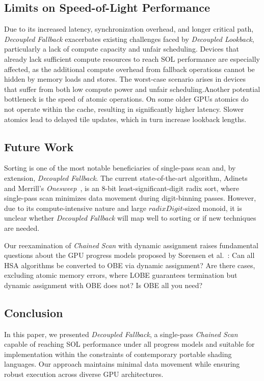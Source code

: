 \documentclass[acmsmall, manuscript, screen, review, anonymous]{acmart}
\begin{document}
\subsection{Limits on Speed-of-Light Performance}
Due to its increased latency, synchronization overhead, and longer critical path, \emph{Decoupled Fallback} exacerbates existing challenges faced by \emph{Decoupled Lookback}, particularly a lack of compute capacity and unfair scheduling. Devices that already lack sufficient compute resources to reach SOL performance are especially affected, as the additional compute overhead from fallback operations cannot be hidden by memory loads and stores. The worst-case scenario arises in devices that suffer from both low compute power and unfair scheduling.Another potential bottleneck is the speed of atomic operations. On some older GPUs atomics do not operate within the cache, resulting in significantly higher latency. Slower atomics lead to delayed tile updates, which in turn increase lookback lengths.

\subsection{Future Work}
Sorting is one of the most notable beneficiaries of single-pass scan and, by extension, \emph{Decoupled Fallback}. The current state-of-the-art algorithm, Adinets and Merrill's \emph{Onesweep}~\cite{adinets2022onesweepfastersignificantdigit}, is an 8-bit least-significant-digit radix sort, where single-pass scan minimizes data movement during digit-binning passes. However, due to its compute-intensive nature and large $radixDigit$-sized monoid, it is unclear whether \emph{Decoupled Fallback} will map well to sorting or if new techniques are needed.

Our reexamination of \emph{Chained Scan} with dynamic assignment raises fundamental questions about the GPU progress models proposed by Sorensen et al.~\cite{sorensen2021}: Can all HSA algorithms be converted to OBE via dynamic assignment? Are there cases, excluding atomic memory errors, where LOBE guarantees termination but dynamic assignment with OBE does not? Is OBE all you need?

\subsection{Conclusion}
In this paper, we presented \emph{Decoupled Fallback}, a single-pass \emph{Chained Scan} capable of reaching SOL performance under all progress models and suitable for implementation within the constraints of contemporary portable shading languages. Our approach maintains minimal data movement while ensuring robust execution across diverse GPU architectures.
\end{document}
